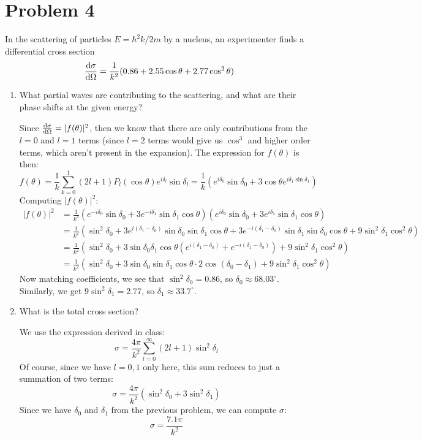 \documentclass[10pt]{article}
\begin{document}
	\section*{Problem 4}
	In the scattering of particles $E = \hbar^2 k/2m$ by a nucleus, an experimenter finds a differential cross 
	section 
	\[
		\dv{\sigma}{\Omega} = \frac{1}{k^2}(0.86 + 2.55 \cos \theta + 2.77 \cos^2 \theta)
	\] 
	\begin{enumerate}[label=\alph*)]
		\item What partial waves are contributing to the scattering, and what are their phase shifts at the 
			given energy?

			\begin{solution}
				Since $\dv{\sigma}{\Omega} = |f(\theta)|^2$, then we know that there are only contributions
				from the $l = 0$ and $l = 1$ terms (since $l = 2$ terms would give us $\cos^3$ and higher 
				order terms, which aren't present in the expansion). The expression for $f(\theta)$ is then: 
				\[
					f(\theta) = \frac{1}{k}\sum_{k = 0}^1 (2l + 1) P_l(\cos \theta) e^{i \delta_l} \sin \delta_l
					= \frac{1}{k}\left(e^{i \delta_0} \sin \delta_0 + 3\cos \theta 
					e^{i \delta_1 \sin \delta_1}\right)
				\] 
				Computing $|f(\theta)|^2$:
				\begin{align*}
					|f(\theta)|^2 &= \frac{1}{k^2}(e^{-i \delta_0} \sin \delta_0 + 3e^{-i \delta_1} \sin \delta_1
						\cos \theta)(e^{i \delta_0} \sin \delta_0 + 3e^{i\delta_1}\sin \delta_1 \cos \theta)\\
								  &= \frac{1}{k^2}(\sin^2 \delta_0 + 3e^{i (\delta_1 - \delta_0)}\sin \delta_0 
								  \sin \delta_1 \cos \theta + 3e^{-i(\delta_1 - \delta_0)} \sin \delta_1 
								  \sin \delta_0 \cos \theta + 9\sin^2 \delta_1 \cos^2 \theta)\\
								  &= \frac{1}{k^2}(\sin^2 \delta_0 + 3 \sin \delta_0 \delta_1 \cos \theta
								  \left( e^{i(\delta_1 - \delta_0)} + e^{-i(\delta_1 - \delta_0)}\right) + 
								  9\sin^2 \delta_1 \cos^2 \theta) \\
								  &= \frac{1}{k^2}(\sin^2 \delta_0 + 3\sin \delta_0 \sin \delta_1 \cos \theta 
								  \cdot 2 \cos(\delta_0 - \delta_1) + 9 \sin^2 \delta_1 \cos^2 \theta)
				\end{align*}
				Now matching coefficients, we see that $\sin^2 \delta_0 = 0.86$, so $\delta_0 \approx
				68.03^\circ$. Similarly, we get $9 \sin^2 \delta_1 = 2.77$, so $\delta_1 \approx 33.7^\circ$. 
			\end{solution}
		\item What is the total cross section?

			\begin{solution}
				We use the expression derived in class:
				\[
					\sigma = \frac{4\pi}{k^2}\sum_{l = 0}^\infty (2l + 1)\sin^2 \delta_l 
				\] 	
				Of course, since we have $l = 0, 1$ only here, this sum reduces to just a summation of two terms:
				\[
				\sigma = \frac{4\pi}{k^2}(\sin^2 \delta_0 + 3 \sin^2 \delta_1)
				\] 
				Since we have $\delta_0$ and $\delta_1$ from the previous problem, we can compute $\sigma$:
				\[
					\sigma = \frac{7.1 \pi}{k^2}
				\] 
			\end{solution}
	\end{enumerate}
\end{document}
